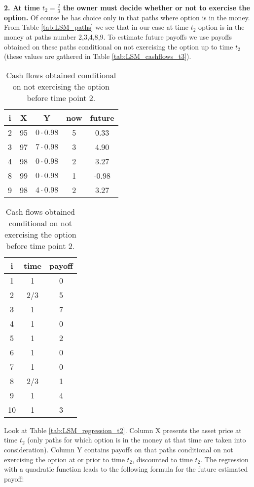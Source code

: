 \documentclass[a4paper,11pt, twoside]{book}
\theoremstyle{definition}
\theoremstyle{remark}
\begin{document}
\FloatBarrier
\noindent \textbf{2. At time $t_2 = \frac{2}{3}$ the owner must decide whether or not to exercise the option.} Of course he has choice only in that paths where option is in the money. From Table \ref{tab:LSM_paths} we see that in our case at time $t_2$ option is in the money at paths number 2,3,4,8,9. To estimate future payoffs we use payoffs obtained on these paths conditional on not exercising the option up to time $t_2$ (these values are gathered in Table \ref{tab:LSM_cashflows_t3}).

\begin{table}[ht]
\parbox{.45\linewidth} {
  \centering
  \caption{Estimating future payoffs at time point 2.}
  \label{tab:LSM_regression_t2}
  \begin{tabular} {||c |c |c || c | c ||}  
  \hline 
    i & X   &  Y  & now   &  future\\ \hline \hline
    2 & 95 & $0\cdot 0.98$ & 5 & 0.33 \\ \hline
    3 & 97 & $7\cdot 0.98$ & 3 & 4.90  \\ \hline
    4 & 98 & $0\cdot 0.98$ & 2 & 3.27 \\ \hline
    8 & 99 & $0\cdot 0.98$ & 1 & -0.98 \\ \hline
    9 & 98 & $4\cdot 0.98$ & 2 & 3.27 \\ \hline
  \end{tabular}
}
\qquad
\parbox{.45\linewidth} {
  \centering
  \caption{Cash flows obtained conditional on not exercising the option before time point 2.}
  \label{tab:LSM_cashflows_t2}
  \begin{tabular}{||c|c|c||}
  \hline 
  i  & time  &  payoff \\ \hline \hline
  1  & 1     &      0 \\ \hline
  2  & 2/3   &      5 \\ \hline
  3  & 1     &      7 \\ \hline
  4  & 1     &      0 \\ \hline
  5  & 1     &      2 \\ \hline
  6  & 1     &      0 \\ \hline
  7  & 1     &      0 \\ \hline
  8  & 2/3   &      1 \\ \hline
  9  & 1     &      4 \\ \hline
  10  & 1     &      3 \\ \hline
  \end{tabular}
}
\end{table}
Look at Table \ref{tab:LSM_regression_t2}. Column X presents the asset price at time $t_2$ (only paths for which option is in the money at that time are taken into consideration). Column Y contains payoffs on that paths conditional on not exercising the option at or prior to time $t_2$, discounted to time $t_2$. The regression with a quadratic function leads to the following formula for the future estimated payoff:
\end{document}
